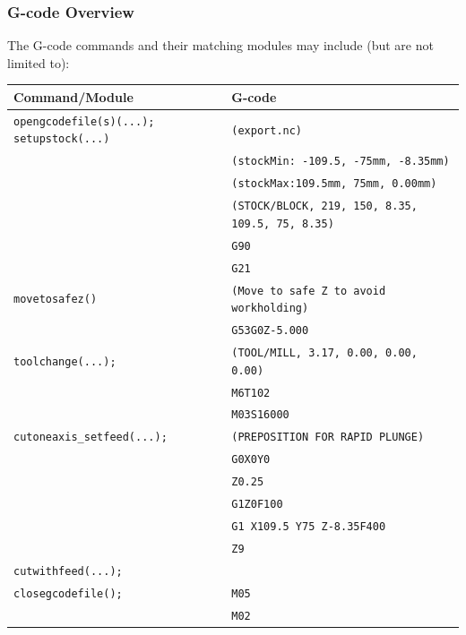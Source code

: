 \documentclass{ltxdoc}
\begin{document}


\subsubsection{G-code Overview}
 
The G-code commands and their matching modules may include (but are not limited to):

\bigskip

\noindent \begin{tabular}{@{}ll@{}} \toprule
 Command/Module                    & G-code                                        \\ \midrule
 \texttt{opengcodefile(s)(...);}
 \texttt{setupstock(...)}          & \texttt{(export.nc)}                          \\
                                   & \texttt{(stockMin: -109.5, -75mm, -8.35mm)}\\
                                   & \texttt{(stockMax:109.5mm, 75mm, 0.00mm)}\\
                                   & \texttt{(STOCK/BLOCK, 219, 150, 8.35, 109.5, 75, 8.35)}\\
                                   & \texttt{G90}\\
                                   & \texttt{G21} \\ \midrule
 \texttt{movetosafez()}            & \texttt{(Move to safe Z to avoid workholding)}\\
                                   & \texttt{G53G0Z-5.000}\\ \midrule
 \texttt{toolchange(...);}         & \texttt{(TOOL/MILL, 3.17, 0.00, 0.00, 0.00)} \\
                                   & \texttt{M6T102} \\
                                   & \texttt{M03S16000} \\ \midrule
 \verb|cutoneaxis_setfeed(...);|   & \texttt{(PREPOSITION FOR RAPID PLUNGE)}\\
  & \texttt{G0X0Y0} \\
  & \texttt{Z0.25} \\
  & \texttt{G1Z0F100} \\
  & \texttt{G1 X109.5 Y75 Z-8.35F400} \\
  & \texttt{Z9}\\
 \texttt{cutwithfeed(...);}\\ \midrule

 \texttt{closegcodefile();}        & \texttt{M05}\\
                                   & \texttt{M02}\\ 
\bottomrule
\end{tabular}
\bigskip
\end{document}
